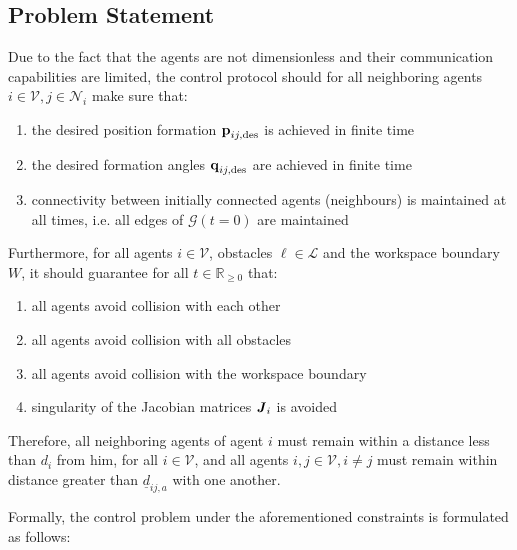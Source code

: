 \subsection{Problem Statement}
Due to the fact that the agents are not dimensionless and their communication
capabilities are limited, the control protocol should for all neighboring
agents $i \in \mathcal{V}, j \in \mathcal{N}_i$ make sure that:

\begin{enumerate}
  \item the desired position formation $\bm{\mathbf{p}}_{ij, \text{des}}$ is achieved
    in finite time
  \item the desired formation angles $\bm{\mathbf{q}}_{ij, \text{des}}$ are achieved
    in finite time
  \item connectivity between initially connected agents (neighbours) is
    maintained at all times, i.e. all edges of $\mathcal{G}(t=0)$ are maintained
\end{enumerate}
Furthermore, for all agents $i \in \mathcal{V}$, obstacles $\ell \in \mathcal{L}$
and the workspace boundary $W$, it should guarantee for all
$t\in\mathbb{R}_{\geq 0}$ that:

\begin{enumerate}
  \item all agents avoid collision with each other
  \item all agents avoid collision with all obstacles
  \item all agents avoid collision with the workspace boundary
  \item singularity of the Jacobian matrices $\bm{\mathit{J}}_i$ is avoided
\end{enumerate}

Therefore, all neighboring agents of agent $i$ must remain within a distance
less than $d_i$ from him, for all $i \in \mathcal{V}$,
and all agents $i, j\in \mathcal{V}, i \neq j$ must remain within distance
greater than $\underline{d}_{ij,a}$ with one another.

Formally, the control problem under the aforementioned constraints is
formulated as follows:

